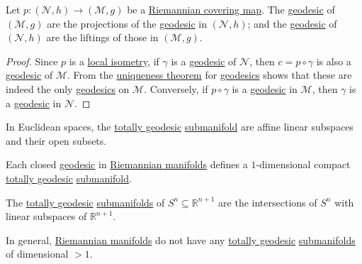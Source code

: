 \begin{proposition}
	Let \(p\colon (\mathcal{N} , h) \to (\mathcal{M} , g)\) be a \hyperref[def:Riemannian-covering-map]{Riemannian covering map}. The \hyperref[def:geodesic]{geodesic} of \((\mathcal{M} , g)\) are the projections of the \hyperref[def:geodesic]{geodesic} in \((\mathcal{N} , h)\); and the \hyperref[def:geodesic]{geodesic} of \((\mathcal{N} , h)\) are the liftings of those in \((\mathcal{M} , g)\).
\end{proposition}
\begin{proof}
	Since \(p\) is a \hyperref[def:local-isometry]{local isometry}, if \(\gamma \) is a \hyperref[def:geodesic]{geodesic} of \(\mathcal{N} \), then \(c = p \circ \gamma \) is also a \hyperref[def:geodesic]{geodesic} of \(\mathcal{M} \). From the \hyperref[thm:geodesic-existence-uniqueness]{uniqueness theorem} for \hyperref[def:geodesic]{geodesics} shows that these are indeed the only \hyperref[def:geodesic]{geodesics} on \(\mathcal{M} \). Conversely, if \(p \circ \gamma \) is a \hyperref[def:geodesic]{geodesic} in \(\mathcal{M} \), then \(\gamma \) is a \hyperref[def:geodesic]{geodesic} in \(\mathcal{N} \).
\end{proof}

\begin{eg}
	In Euclidean spaces, the \hyperref[def:totally-geodesic]{totally geodesic} \hyperref[def:submanifold]{submanifold} are affine linear subspaces and their open subsets.
\end{eg}

\begin{eg}
	Each closed \hyperref[def:geodesic]{geodesic} in \hyperref[def:Riemannian-manifold]{Riemannian manifolds} defines a \(1\)-dimensional compact \hyperref[def:totally-geodesic]{totally geodesic} \hyperref[def:submanifold]{submanifold}.
\end{eg}

\begin{eg}
	The \hyperref[def:totally-geodesic]{totally geodesic} \hyperref[def:submanifold]{submanifolds} of \(S^n \subseteq \mathbb{R} ^{n+1}\) are the intersections of \(S^n\) with linear subspaces of \(\mathbb{R} ^{n+1}\).
\end{eg}

\begin{eg}
	In general, \hyperref[def:Riemannian-manifold]{Riemannian manifolds} do not have any \hyperref[def:totally-geodesic]{totally geodesic} \hyperref[def:submanifold]{submanifolds} of dimensional \(> 1\).
\end{eg}

